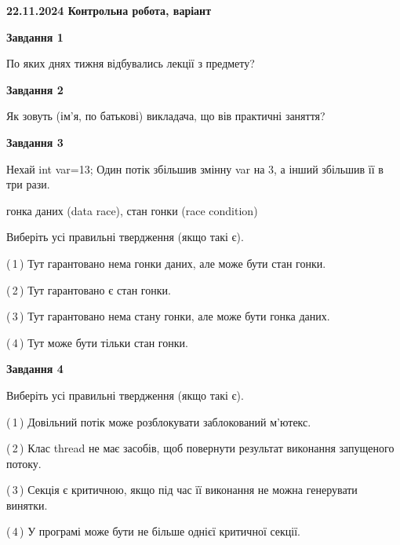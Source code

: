 \documentclass[12pt, ukrainian]{article}
\begin{document}
\begin {large}

\textbf{22.11.2024 Контрольна робота, варіант  }\par


{

\begin{center}
\textbf{Завдання 1}
\end{center}

По яких днях тижня відбувались лекції з предмету?


\begin{center}
\textbf{Завдання 2}
\end{center}

Як зовуть (ім'я, по батькові) викладача, що вів практичні заняття?


\begin{center}
\textbf{Завдання 3}
\end{center}

Нехай int var=13; Один потік збільшив змінну var на 3, а інший збільшив її в три рази.

гонка даних (data race), стан гонки (race condition)

Виберіть усі правильні твердження (якщо такі є).\par
\vspace{2mm}
(\,1\,) Тут гарантовано нема гонки даних, але може бути стан гонки.%

(\,2\,) Тут гарантовано є стан гонки.%

(\,3\,) Тут гарантовано нема стану гонки, але може бути гонка даних.%

(\,4\,) Тут може бути тільки стан гонки.%


\begin{center}
\textbf{Завдання 4}
\end{center}

Виберіть усі правильні твердження (якщо такі є).\par
\vspace{2mm}

(\,1\,) Довільний потік може розблокувати заблокований м’ютекс.%

(\,2\,) Клас thread не має засобів, щоб повернути результат виконання запущеного потоку.%

(\,3\,) Секція є критичною, якщо під час її виконання не можна генерувати винятки.%

(\,4\,) У програмі може бути не більше однієї критичної секції.%


}
\end{large}
\end{document}
